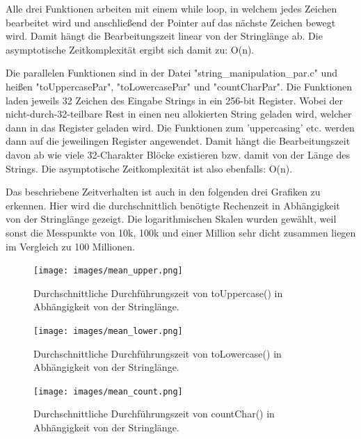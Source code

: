 \documentclass[plainarticle,zihtitle,german,final,hyperref,utf8]{zihpub}
\begin{document}
Alle drei Funktionen arbeiten mit einem while loop, in welchem jedes Zeichen bearbeitet wird und anschließend der Pointer auf das nächste Zeichen bewegt wird. Damit hängt die Bearbeitungszeit linear von der Stringlänge ab. Die asymptotische Zeitkomplexität ergibt sich damit zu: O(n).
\newline

Die parallelen Funktionen sind in der Datei "string\_manipulation\_par.c" und heißen "toUppercasePar", "toLowercasePar" und "countCharPar".
Die Funktionen laden jeweils 32 Zeichen des Eingabe Strings in ein 256-bit Register. Wobei der nicht-durch-32-teilbare Rest in einen neu allokierten String geladen wird, welcher dann in das Register geladen wird. Die Funktionen zum 'uppercasing' etc. werden dann auf die jeweilingen Register angewendet.
Damit hängt die Bearbeitungszeit davon ab wie viele 32-Charakter Blöcke existieren bzw. damit von der Länge des Strings. Die asymptotische Zeitkomplexität ist also ebenfalls: O(n).
\newline

Das beschriebene Zeitverhalten ist auch in den folgenden drei Grafiken zu erkennen.
Hier wird die durchschnittlich benötigte Rechenzeit in Abhängigkeit von der Stringlänge gezeigt.
Die logarithmischen Skalen wurden gewählt, weil sonst die Messpunkte von 10k, 100k und einer Million sehr dicht zusammen liegen im Vergleich zu 100 Millionen.


\begin{figure}
	\begin{center}
		\texttt{[image: images/mean\_upper.png]}
		\caption{Durchschnittliche Durchführungszeit von toUppercase() in Abhängigkeit von der Stringlänge.}
		\label{fig:mean_upper}
	\end{center}
\end{figure}

\begin{figure}
	\begin{center}
		\texttt{[image: images/mean\_lower.png]}
		\caption{Durchschnittliche Durchführungszeit von toLowercase() in Abhängigkeit von der Stringlänge.}
		\label{fig:mean_upper}
	\end{center}
\end{figure}

\begin{figure}
	\begin{center}
		\texttt{[image: images/mean\_count.png]}
		\caption{Durchschnittliche Durchführungszeit von countChar() in Abhängigkeit von der Stringlänge.}
		\label{fig:mean_upper}
	\end{center}
\end{figure}
\end{document}
